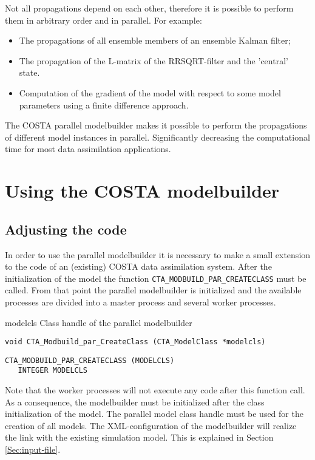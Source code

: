 Not all propagations depend on each other, therefore it is possible to
perform them in arbitrary order and in parallel. For example:
\begin{itemize}
\item The propagations of all ensemble members of an ensemble Kalman filter; 
\item The propagation of the L-matrix of the RRSQRT-filter and the 
      'central' state.
\item Computation of the gradient of the model with respect to some model
      parameters using a finite difference approach.
\end{itemize}

The COSTA parallel modelbuilder makes it possible to perform the
propagations of different model instances in parallel. Significantly decreasing
the computational time for most data assimilation applications.

\section{Using the COSTA modelbuilder} \label{Sec:Using the COSTA modelbuilder}
\subsection{Adjusting the code}
In order to use the parallel modelbuilder it is necessary to make a small
extension to the code of an (existing) COSTA data assimilation system.
After the initialization of the model the function 
{\tt CTA\_MODBUILD\_PAR\_CREATECLASS} must be called. From that
point the parallel modelbuilder is initialized and the available processes
are divided into  a master process and several worker processes.

\horzline
\begin{tabbing}
\functab
{}
 {modelcls}  {Class handle of the parallel modelbuilder }\\
\end{tabbing}
\horzline

\begin{verbatim}
void CTA_Modbuild_par_CreateClass (CTA_ModelClass *modelcls)
\end{verbatim}

\begin{verbatim}
CTA_MODBUILD_PAR_CREATECLASS (MODELCLS)
   INTEGER MODELCLS
\end{verbatim}

Note that the worker processes will not execute any code after this function
call. As a consequence, the modelbuilder must be initialized after the
class initialization of the model. The parallel model class handle must be
used for the creation of all models. The XML-configuration of the
modelbuilder will realize the link with the existing simulation model. This is
explained in Section \ref{Sec:input-file}. 

